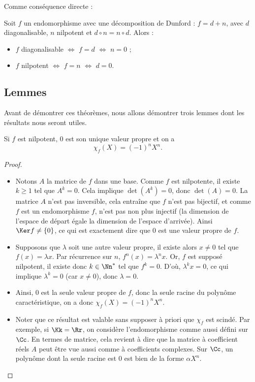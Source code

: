 \documentclass[12pt, class=report,crop=false]{standalone}
\begin{document}
\bigskip

Comme conséquence directe :
\begin{corollaire}
Soit $f$ un endomorphisme avec une décomposition de Dunford : $f= d+n$, avec
$d$ diagonalisable, $n$ nilpotent et $d \circ n = n \circ d$. Alors :
\begin{itemize}
  \item $f$ diagonalisable $\iff$ $f=d$ $\iff$ $n=0$ ;
  \item $f$ nilpotent $\iff$ $f=n$ $\iff$ $d=0$.
\end{itemize}
\end{corollaire}


 
 
\subsection{Lemmes}

 
Avant de démontrer ces théorèmes, nous allons démontrer 
trois lemmes dont les résultats nous seront utiles.


\begin{lemme}
\label{lem:jordan1}
Si $f$ est nilpotent, $0$ est son unique valeur propre et on a 
$$\chi_f(X)=(-1)^n X^n.$$
\end{lemme} 

\begin{proof}~
\begin{itemize}
  \item Notons $A$ la matrice de $f$ dans une base. 
  Comme $f$ est nilpotente, il existe $k\ge1$ tel que $A^k=0$. Cela implique 
  $\det(A^k) = 0$, donc $\det(A) = 0$. La matrice $A$ n'est pas inversible, cela entraîne que $f$ n'est pas bijectif, et comme $f$ est un endomorphisme $f$, n'est pas non plus injectif (la dimension de l'espace de départ égale la dimension de l'espace d'arrivée).
  Ainsi  $\Ker f\neq \{0\}$, ce qui est exactement dire que $0$ est une valeur propre de $f$.
  
  \item Supposons que $\lambda$ soit une autre valeur propre, il existe alors $x\neq 0$ tel que $f(x)=\lambda x$. Par récurrence sur $n$,  $f^n(x)=\lambda^n x$. Or, $f$ est supposé nilpotent, il existe donc $k\in\Nn^*$ tel que $f^k=0$. D'où, $\lambda^k x=0$, ce qui implique $\lambda^k=0$ (car $x\neq 0$), donc $\lambda =0$. 
  
  \item Ainsi, $0$ est la seule valeur propre de $f$, donc la seule racine du polynôme caractéristique, on a donc $\chi_f(X)=(-1)^nX^n$. 
  
  \item Noter que ce résultat est valable sans supposer à priori que $\chi_f$ est scindé. Par exemple, si $\Kk = \Rr$, on considère l'endomorphisme comme aussi défini sur $\Cc$. En termes de matrice, cela revient à dire que la matrice à coefficient réels $A$ peut être vue aussi comme à coefficients complexes. Sur $\Cc$, un polynôme dont la seule racine est $0$ est bien de la forme $\alpha X^n$.
\end{itemize}
\end{proof}
\end{document}
